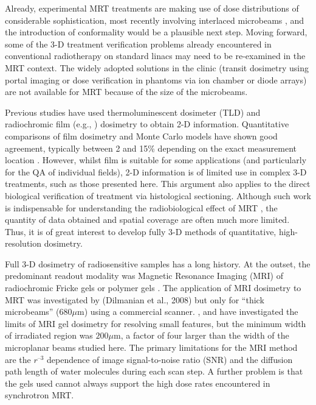 \documentclass[12pt]{article}
\begin{document}
Already, experimental MRT treatments are making use of dose distributions of considerable sophistication, most recently involving interlaced microbeams \cite{brauer2013preclinical, serduc2009first,serduchigh-precision2010}, and the introduction of conformality would be a plausible next step. Moving forward, some of the 3-D treatment verification problems already encountered in conventional radiotherapy on standard linacs may need to be re-examined in the MRT context. The widely adopted solutions in the clinic (transit dosimetry using portal imaging or dose verification in phantoms via ion chamber or diode arrays) are not available for MRT because of the size of the microbeams. 

Previous studies have used thermoluminescent dosimeter (TLD) \cite{ptaszkiewicz2008tld} and radiochromic film (e.g., \cite{crosbie2008method, serduchigh-precision2010}) dosimetry to obtain 2-D information. Quantitative comparisons of film dosimetry and Monte Carlo models have shown good agreement, typically between 2 and 15\% depending on the exact measurement location \cite{martinez-roviradevelopment2012}.  However, whilst film is suitable for some applications (and particularly for the QA of individual fields), 2-D information is of limited use in complex 3-D treatments, such as those presented here. This argument also applies to the direct biological verification of treatment via histological sectioning. Although such work is indispensable for understanding the radiobiological effect of MRT \cite{crosbie2010tumor}, the quantity of data obtained and spatial coverage are often much more limited. Thus, it is of great interest to develop fully 3-D methods of quantitative, high-resolution dosimetry.

Full 3-D dosimetry of radiosensitive samples has a long history. At the outset, the predominant readout modality was Magnetic Resonance Imaging (MRI) of radiochromic Fricke gels \cite{appleby1987imaging, schreiner2004review} or polymer gels \cite{baldock2010polymer,maryanski1993nmr}. The application of MRI dosimetry to MRT was investigated by (Dilmanian et al., 2008) but only for “thick microbeams” ($680\mu $m) using a commercial scanner. \cite{berghigh2004}, \cite{bayrederthe2008} and \cite{heilemann2015pushing} have investigated the limits of MRI gel dosimetry for resolving small features, but the minimum width of irradiated region was $200\mu $m, a factor of four larger than the width of the microplanar beams studied here. The primary limitations for the MRI method are the $r^{–3}$ dependence of image signal-to-noise ratio (SNR) and the diffusion path length of water molecules during each scan step. A further problem is that the gels used cannot always support the high dose rates encountered in synchrotron MRT.
\end{document}

